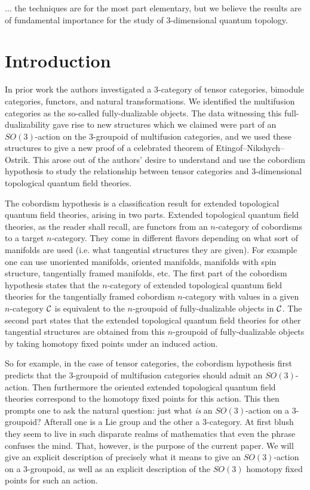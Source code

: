 \documentclass{amsart}
\begin{document}
... the techniques are for the most part elementary, but we believe the results are of fundamental importance for the study of 3-dimensional quantum topology.


\section{Introduction}

In prior work the authors investigated a 3-category of tensor categories, bimodule categories, functors, and natural transformations. We identified the multifusion categories as the so-called fully-dualizable objects. The data witnessing this full-dualizability gave rise to new structures which we claimed were part of an $SO(3)$-action on the 3-groupoid of multifusion categories, and we used these structures to give a new proof of a celebrated theorem of Etingof--Nikshych--Ostrik. This arose out of the authors' desire to understand and use the cobordism hypothesis to study the relationship between tensor categories and 3-dimensional topological quantum field theories. 

The cobordism hypothesis is a classification result for extended topological quantum field theories, arising in two parts. Extended topological quantum field theories, as the reader shall recall, are functors from an $n$-category of cobordisms to a target $n$-category. They come in different flavors depending on what sort of manifolds are used (i.e. what tangential structures they are given). For example one can use unoriented manifolds, oriented manifolds, manifolds with spin structure, tangentially framed manifolds, etc. The first part of the cobordism hypothesis states that the $n$-category of extended topological quantum field theories for the tangentially framed cobordism $n$-category with values in a given $n$-category $\mathcal C$ is equivalent to the $n$-groupoid of fully-dualizable objects in $\mathcal C$. The second part states that the  extended topological quantum field theories for other tangential structures are obtained from this $n$-groupoid of fully-dualizable objects by taking homotopy fixed points under an induced action. 

So for example, in the case of tensor categories, the cobordism hypothesis first predicts that the 3-groupoid of multifusion categories should admit an $SO(3)$-action. Then furthermore the oriented extended topological quantum field theories correspond to the homotopy fixed points for this action. This then prompts one to ask the natural question: just what \emph{is} an $SO(3)$-action on a 3-groupoid? Afterall one is a Lie group and the other a 3-category. At first blush they seem to live in such disparate realms of mathematics that even the phrase confuses the mind.
That, however, is the purpose of the current paper. We will give an explicit description of precisely what it means to give an $SO(3)$-action on a 3-groupoid, as well as an explicit description of the $SO(3)$ homotopy fixed points for such an action.
\end{document}
